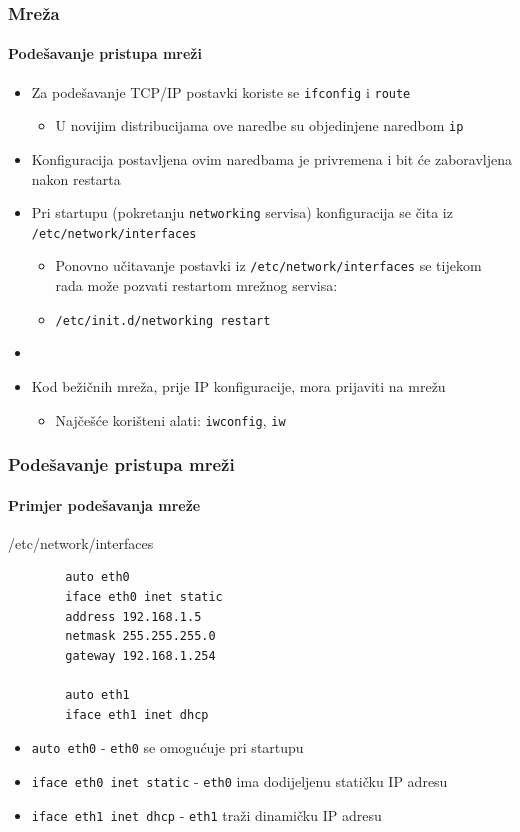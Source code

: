 \documentclass[table,usenames,dvipsnames]{beamer}
\newcommand{\shell}[1]{\texttt{#1}}
\begin{document}
\begin{frame}[t]
	\frametitle{Mreža}
	\framesubtitle{Podešavanje pristupa mreži}
	\begin{itemize}
		\item Za podešavanje TCP/IP postavki koriste se \shell{ifconfig} i \shell{route}
		\begin{itemize}
			\item U novijim distribucijama ove naredbe su objedinjene naredbom \shell{ip}
		\end{itemize}
		\item Konfiguracija postavljena ovim naredbama je privremena i bit će zaboravljena nakon restarta
		\item Pri startupu (pokretanju \shell{networking} servisa) konfiguracija se čita iz \shell{/etc/network/interfaces}
		\begin{itemize}
			\item Ponovno učitavanje postavki iz \shell{/etc/network/interfaces} se tijekom rada može pozvati restartom mrežnog servisa:
			\item[] \shell{/etc/init.d/networking restart}
		\end{itemize}
		\item[]
		\item Kod bežičnih mreža, prije IP konfiguracije, mora prijaviti na mrežu
		\begin{itemize}
			\item Najčešće korišteni alati: \shell{iwconfig}, \shell{iw}
		\end{itemize}
	\end{itemize}
\end{frame}

\begin{frame}[fragile]
	\frametitle{Podešavanje pristupa mreži}
	\framesubtitle{Primjer podešavanja mreže}
	\begin{block}{/etc/network/interfaces}
		\ttfamily
		\begin{verbatim}
		auto eth0
		iface eth0 inet static
		address 192.168.1.5
		netmask 255.255.255.0
		gateway 192.168.1.254
		
		auto eth1
		iface eth1 inet dhcp
		\end{verbatim}
	\end{block}
	\begin{itemize}
		\item \shell{auto eth0} - \shell{eth0} se omogućuje pri startupu
		\item \shell{iface eth0 inet static} - \shell{eth0} ima dodijeljenu statičku IP adresu
		\item \shell{iface eth1 inet dhcp} - \shell{eth1} traži dinamičku IP adresu
	\end{itemize}
\end{frame}
\end{document}
